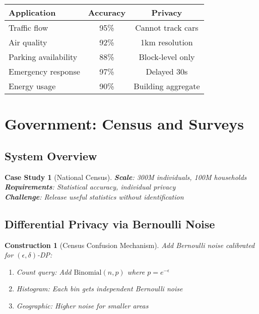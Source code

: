 \documentclass[11pt,final]{article}
\newtheorem{construction}[theorem]{Construction}
\newtheorem{casestudy}[theorem]{Case Study}
\begin{document}
\begin{center}
\begin{tabular}{lcc}
\toprule
\textbf{Application} & \textbf{Accuracy} & \textbf{Privacy} \\
\midrule
Traffic flow & 95\% & Cannot track cars \\
Air quality & 92\% & 1km resolution \\
Parking availability & 88\% & Block-level only \\
Emergency response & 97\% & Delayed 30s \\
Energy usage & 90\% & Building aggregate \\
\bottomrule
\end{tabular}
\end{center}

\section{Government: Census and Surveys}

\subsection{System Overview}

\begin{casestudy}[National Census]
\textbf{Scale}: 300M individuals, 100M households\\
\textbf{Requirements}: Statistical accuracy, individual privacy\\
\textbf{Challenge}: Release useful statistics without identification
\end{casestudy}

\subsection{Differential Privacy via Bernoulli Noise}

\begin{construction}[Census Confusion Mechanism]
Add Bernoulli noise calibrated for $(\epsilon, \delta)$-DP:
\begin{enumerate}
    \item Count query: Add $\text{Binomial}(n, p)$ where $p = e^{-\epsilon}$
    \item Histogram: Each bin gets independent Bernoulli noise
    \item Geographic: Higher noise for smaller areas
\end{enumerate}
\end{construction}
\end{document}
